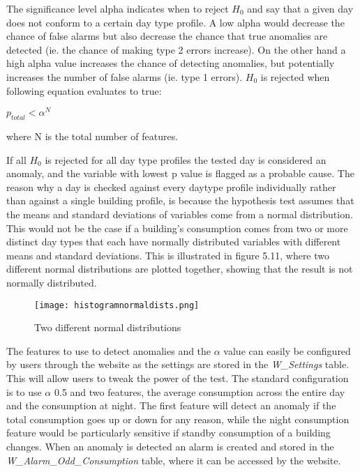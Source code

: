 The significance level alpha indicates when to reject $H_0$ and say that a given day does not conform to a certain day type profile. A low alpha would decrease the chance of false alarms but also decrease the chance that true anomalies are detected (ie. the chance of making type 2 errors increase). On the other hand a high alpha value increases the chance of detecting anomalies, but potentially increases the number of false alarms (ie. type 1 errors). $H_0$ is rejected when following equation evaluates to true:
\begin{center}
$p_{total} <\alpha^N$
\end{center}
where N is the total number of features.

If all $H_0$ is rejected for all day type profiles the tested day is considered an anomaly, and the variable with lowest p value is flagged as a probable cause. The reason why a day is checked against every daytype profile individually rather than against a single building profile, is because the hypothesis test assumes that the means and standard deviations of variables come from a normal distribution. This would not be the case if a building's consumption comes from two or more distinct day types that each have normally distributed variables with different means and standard deviations. This is illustrated in figure 5.11, where two different normal distributions are plotted together, showing that the result is not normally distributed.
\begin{figure}
\begin{center}
\texttt{[image: histogramnormaldists.png]}
\end{center}
\caption{Two different normal distributions}
\end{figure}

The features to use to detect anomalies and the $\alpha$ value can easily be configured by users through the website as the settings are stored in the \emph{W\_Settings} table. This will allow users to tweak the power of the test. The standard configuration is to use $\alpha$ 0.5 and two features, the average consumption across the entire day and the consumption at night. The first feature will detect an anomaly if the total consumption goes up or down for any reason, while the night consumption feature would be particularly sensitive if standby consumption of a building changes. When an anomaly is detected an alarm is created and stored in the \emph{W\_Alarm\_Odd\_Consumption} table, where it can be accessed by the website.


